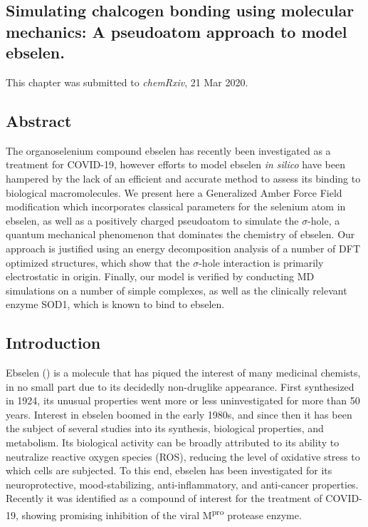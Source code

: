 \begin{refsection}

\chapter[Simulating chalcogen bonding using molecular mechanics]{Simulating chalcogen bonding using molecular mechanics: A pseudoatom approach to model ebselen.}

This chapter was submitted to \textit{chemRxiv}, 21 Mar 2020.\autocite{Fellowes2020chemrxiv}

\section{Abstract}
The organoselenium compound ebselen has recently been investigated as a treatment for COVID-19, however efforts to model ebselen \emph{in silico} have been hampered by the lack of an efficient and accurate method to assess its binding to biological macromolecules. We present here a Generalized Amber Force Field modification which incorporates classical parameters for the selenium atom in ebselen, as well as a positively charged pseudoatom to simulate the $\sigma$-hole, a quantum mechanical phenomenon that dominates the chemistry of ebselen. Our approach is justified using an energy decomposition analysis of a number of DFT optimized structures, which show that the $\sigma$-hole interaction is primarily electrostatic in origin. Finally, our model is verified by conducting MD simulations on a number of simple complexes, as well as the clinically relevant enzyme SOD1, which is known to bind to ebselen.

\section{Introduction}
Ebselen () is a molecule that has piqued the interest of many medicinal chemists, in no small part due to its decidedly non-druglike appearance.
First synthesized in 1924, its unusual properties went more or less uninvestigated for more than 50 years.\autocite{Lesser1924}
Interest in ebselen boomed in the early 1980s, and since then it has been the subject of several studies into its synthesis, biological properties, and metabolism.\autocite{Weber1976,Renson1981,Muller1984,Wendel1984,Parnham1984,Engman1989,Schewe1995,Bhabak2010,Iwasaki2017}
Its biological activity can be broadly attributed to its ability to neutralize reactive oxygen species (ROS), reducing the level of oxidative stress to which cells are subjected.\autocite{Mugesh2000}
To this end, ebselen has been investigated for its neuroprotective, mood-stabilizing, anti-inflammatory, and anti-cancer properties.\autocite{Parnham1987,Kil2007,Singh2013,Azad2014,Parnham2000,Chantadul2020}
Recently it was identified as a compound of interest for the treatment of COVID-19, showing promising inhibition of the viral M\textsuperscript{pro} protease enzyme.\autocite{Jin2020}


\end{refsection}
